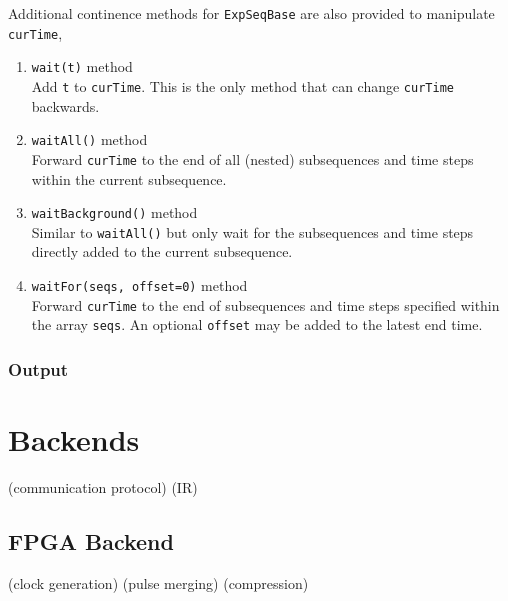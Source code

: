 Additional continence methods for \verb`ExpSeqBase` are also provided
to manipulate \verb`curTime`,
\begin{enumerate}
\item \verb`wait(t)` method\\
  Add \verb`t` to \verb`curTime`.
  This is the only method that can change \verb`curTime` backwards.
\item \verb`waitAll()` method\\
  Forward \verb`curTime` to the end of all (nested) subsequences and time steps
  within the current subsequence.
\item \verb`waitBackground()` method\\
  Similar to \verb`waitAll()` but only wait for the subsequences and time steps
  directly added to the current subsequence.
\item \verb`waitFor(seqs, offset=0)` method\\
  Forward \verb`curTime` to the end of subsequences and time steps specified
  within the array \verb`seqs`.
  An optional \verb`offset` may be added to the latest end time.
\end{enumerate}

\subsubsection{Output}

\section{Backends}
\label{ch:computer-control:backend}
(communication protocol)
(IR)

\subsection{FPGA Backend}
(clock generation)
(pulse merging)
(compression)

